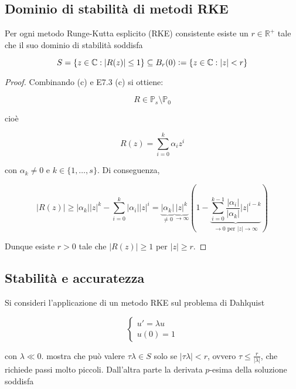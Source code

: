 \documentclass[hidelinks, 10pt]{report}
\begin{document}
\subsection{Dominio di stabilit\`a di metodi RKE}	\label{section:22.2}
Per ogni metodo Runge-Kutta esplicito (RKE) consistente esiste un $ r \in \mathbb{R}^{+} $ tale che il suo dominio di stabilit\`a soddisfa

\[ S = \{ z \in \mathbb{C} : \vert R(z) \vert \le 1 \} \subseteq B_{r}(0) \vcentcolon= \{ z \in \mathbb{C} : \vert z \vert < r \} \]

\begin{proof}
Combinando  (c) e E7.3 (c) si ottiene:

\[ R \in \mathbb{P}_{s} \setminus \mathbb{P}_{0} \]

cio\`e

\[ R(z) = \sum\limits_{i = 0}^{k} \alpha_{i} z^{i} \]

con $ \alpha_{k} \ne 0 $ e $ k \in \{ 1, \dotsc, s \} $. Di conseguenza,

\[ \vert R(z) \vert \ge \vert \alpha_{k} \vert \vert z \vert^{k} - \sum\limits_{i = 0}^{k} \vert \alpha_{i} \vert \vert z \vert^{i} = \underbrace{\vert \alpha_{k} \vert}_{\ne 0} \underbrace{\vert z \vert^{k}}_{\to \infty} \left( 1 - \underbrace{\sum\limits_{i = 0}^{k - 1} \frac{\vert \alpha_{i} \vert}{\vert \alpha_{k} \vert} \vert z \vert^{i - k}}_{\to 0 \text{ per } \vert z \vert \to \infty} \right) \]

Dunque esiste $ r > 0 $ tale che $ \vert R(z) \vert \ge 1 $ per $ \vert z \vert \ge r $. 
\end{proof}

\subsection{Stabilit\`a e accuratezza}
Si consideri l'applicazione di un metodo RKE sul problema di Dahlquist

\begin{equation}	\label{equation:Dahlquist}
\begin{cases}
u' = \lambda u \\
u(0) = 1 
\end{cases}
\end{equation}

con $ \lambda \ll 0 $.  mostra che pu\`o valere $ \tau \lambda \in S $ solo se $ \vert \tau \lambda \vert < r $, ovvero $ \tau \le \frac{r}{\vert \lambda \vert} $, che richiede passi molto piccoli. Dall'altra parte la derivata $ p $-esima della soluzione soddisfa
\end{document}
